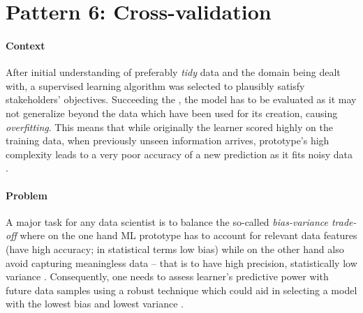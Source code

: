 \section{Pattern 6: Cross-validation}

\paragraph*{Context}
After initial understanding of preferably \emph{tidy} data and the domain being dealt with, a supervised learning algorithm was selected to plausibly satisfy stakeholders' objectives.
Succeeding the , the model has to be evaluated as it may not generalize beyond the data which have been used for its creation, causing \emph{overfitting}. 
This means that while originally the learner scored highly on the training data, when previously unseen information arrives, prototype's high complexity leads to a very poor accuracy of a new prediction as it fits noisy data \parencite{NinaBookR2014}.

\paragraph*{Problem}
A major task for any data scientist is to balance the so-called \emph{bias-variance trade-off} where on the one hand \ac{ML} prototype has to account for relevant data features (have high accuracy; in statistical terms low bias) while on the other hand also avoid capturing meaningless data -- that is to have high precision, statistically low variance \parencite{JakeVanderPlas2016PythonHandbook}.
Consequently, one needs to assess learner's predictive power with future data samples using a robust technique which could aid in selecting a model with the lowest bias and lowest variance \parencite{Kohavi:1995:SCB:1643031.1643047}.

